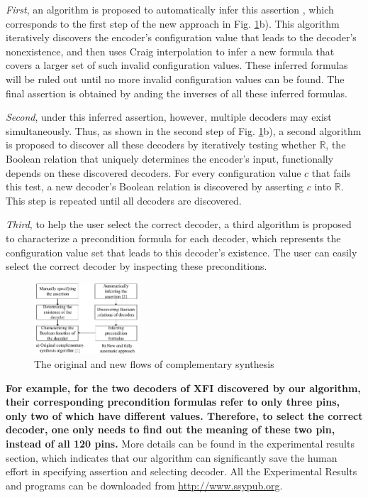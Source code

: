 \documentclass[journal]{IEEEtran}
\begin{document}
\emph{First},
an algorithm is proposed to automatically infer this assertion \cite{ShengYuShen:iccad11},
which corresponds to the first step of the new approach in Fig. \ref{flow}b).
This algorithm iteratively discovers the encoder's configuration value that leads to the decoder's nonexistence,
and then uses Craig interpolation to infer a new formula that covers a larger set of such invalid configuration values.
These inferred formulas will be ruled out until no more invalid configuration values can be found.
The final assertion is obtained by anding the inverses of all these inferred formulas.

\emph{Second},
under this inferred assertion,
however,
multiple decoders may exist simultaneously.
Thus,
as shown in the second step of Fig. \ref{flow}b),
a second algorithm is proposed to discover all these decoders by iteratively testing whether $\mathbb{R}$,
the Boolean relation that uniquely determines the encoder's input,
functionally depends\cite{funcdep} on these discovered decoders.
For every configuration value $c$ that fails this test,
a new decoder's Boolean relation is discovered by asserting $c$ into $\mathbb{R}$.
This step is repeated until all decoders are discovered.

\emph{Third},
to help the user select the correct decoder,
a third algorithm is proposed to characterize a precondition formula for each decoder,
which represents the configuration value set that leads to this decoder's existence.
The user can easily select the correct decoder by inspecting these preconditions.

\begin{figure}[t]
\begin{center}
\includegraphics[width=0.35\textwidth]{flow}
\end{center}
\caption{The original and new flows of complementary synthesis}
  \label{flow}
\end{figure}

\textbf{For example,
for the two decoders of XFI discovered by our algorithm,
their corresponding precondition formulas refer to only three pins,
\textbf{only two of which} have different values.
Therefore,
to select the correct decoder,
one only needs to find out the meaning of these two pin,
instead of all 120 pins.}
More details can be found in the experimental results section,
which indicates that our algorithm can significantly save the human effort in specifying assertion and selecting decoder.
All the Experimental Results and programs can be downloaded from \url{http://www.ssypub.org}.
\end{document}
